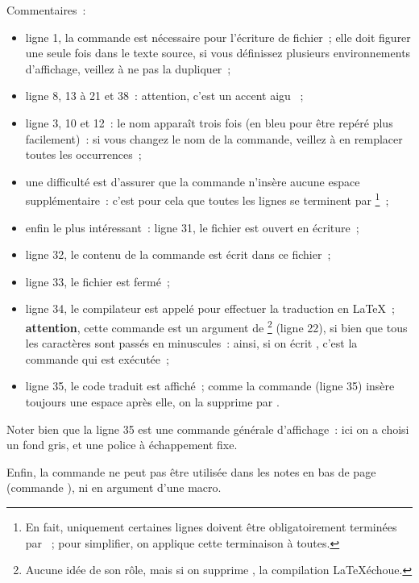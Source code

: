 Commentaires~:
\begin{itemize}
  \item ligne 1, la commande  est nécessaire pour l'écriture de fichier~; elle doit figurer une seule fois dans le texte source, si vous définissez plusieurs environnements d'affichage, veillez à ne pas la dupliquer~;
  \item ligne 8, 13 à 21 et 38~: attention, c'est un accent aigu ~;
  \item ligne 3, 10 et 12~: le nom  apparaît trois fois (en bleu pour être repéré plus facilement)~: si vous changez le nom de la commande, veillez à en remplacer toutes les occurrences~;
  \item une difficulté est d'assurer que la commande n'insère aucune espace supplémentaire~: c'est pour cela que toutes les lignes se terminent par \tpp{\%}\footnote{En fait, uniquement certaines lignes doivent être obligatoirement terminées par \tpp{\%}~; pour simplifier, on applique cette terminaison à toutes.}~;
    \item enfin le plus intéressant~: ligne 31, le fichier  est ouvert en écriture~;
    \item ligne 32, le contenu de la commande est écrit dans ce fichier~;
    \item ligne 33, le fichier est fermé~;
    \item ligne 34, le compilateur est appelé pour effectuer la traduction en \LaTeX~; {\bf attention}, cette commande est un argument de \footnote{Aucune idée de son rôle, mais si on supprime , la compilation \LaTeX échoue.} (ligne 22), si bien que tous les caractères sont passés en minuscules~: ainsi, si on écrit , c'est la commande   qui est exécutée~;
    \item ligne 35, le code traduit est affiché~; comme la commande  (ligne 35) insère toujours une espace après elle, on la supprime par .
\end{itemize}

Noter bien que la ligne 35 est une commande générale d'affichage~: ici on a choisi un fond gris, et une police à échappement fixe.

Enfin, la commande  ne peut pas être utilisée dans les notes en bas de page (commande ), ni en argument d'une macro.


